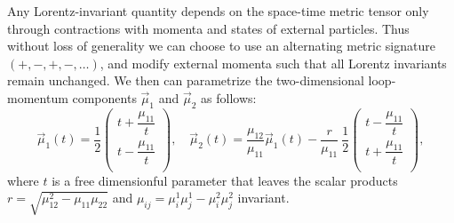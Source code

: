 Any Lorentz-invariant quantity depends on the space-time metric tensor only through contractions with momenta and states of external particles.
Thus  without loss of generality we can choose to use an alternating metric signature $(+,-,+,-,\ldots)$,
and modify external momenta such that all Lorentz invariants remain unchanged.
We then can parametrize the two-dimensional loop-momentum components
$\vec{\mu}_1$ and $\vec{\mu}_2$ as follows:
\begin{equation}
  \vec{\mu}_1(t)  = \frac{1}{2}\begin{pmatrix}
    t+\dfrac{\mu_{11}}{t} \\
    t-\dfrac{\mu_{11}}{t} \\
  \end{pmatrix}, \quad
  \vec{\mu}_2(t)  = \frac{\mu_{12}}{\mu_{11}}\vec{\mu}_1(t) - \frac{r}{\mu_{11}}~\frac{1}{2}\begin{pmatrix}
    t-\dfrac{\mu_{11}}{t} \\
    t+\dfrac{\mu_{11}}{t} \\
  \end{pmatrix},
  \label{eq:muparam}
\end{equation}
where $t$ is a free dimensionful parameter that leaves the scalar products
$r = \sqrt{\mu_{12}^2-\mu_{11} \mu_{22}}$ and 
$\mu_{ij} = \mu_i^1 \mu_j^1 - \mu_i^2 \mu_j^2$ invariant. %


